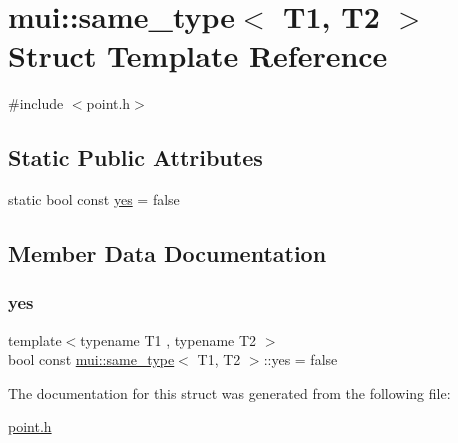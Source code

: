 \hypertarget{structmui_1_1same__type}{}\section{mui\+:\+:same\+\_\+type$<$ T1, T2 $>$ Struct Template Reference}
\label{structmui_1_1same__type}


{\ttfamily \#include $<$point.\+h$>$}

\subsection*{Static Public Attributes}
\begin{DoxyCompactItemize}
\item 
static bool const \hyperlink{structmui_1_1same__type_a6ca0969200f95d9f1ef93d2e4f38ffc7}{yes} = false
\end{DoxyCompactItemize}


\subsection{Member Data Documentation}
\mbox{\label{structmui_1_1same__type_a6ca0969200f95d9f1ef93d2e4f38ffc7}} 
\subsubsection{\texorpdfstring{yes}{yes}}
{\footnotesize\ttfamily template$<$typename T1 , typename T2 $>$ \\
bool const \hyperlink{structmui_1_1same__type}{mui\+::same\+\_\+type}$<$ T1, T2 $>$\+::yes = false\hspace{0.3cm}{\ttfamily [static]}}



The documentation for this struct was generated from the following file\+:\begin{DoxyCompactItemize}
\item 
\hyperlink{point_8h}{point.\+h}\end{DoxyCompactItemize}
